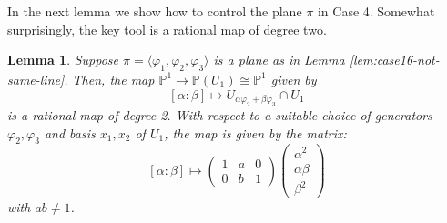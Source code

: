 \documentclass[10pt,reqno]{amsart}
\newcommand{\la}{\langle}
\newcommand{\ra}{\rangle}
\newcommand{\PP}{\mathbb P}
\renewcommand{\a}{\alpha}
\renewcommand{\b}{\beta}
\newcommand{\f}{\varphi}
\newtheorem{lemma}[theorem]{Lemma}
\theoremstyle{definition}
\begin{document}
\noindent In the next lemma we show how to control the plane $\pi$ in Case 4. Somewhat surprisingly, the key tool is a rational map of degree two.

\begin{lemma} \label{lem:rational-map}
Suppose $\pi =\la \f_1, \f_2, \f_3 \ra$ is a plane as in Lemma \ref{lem:case16-not-same-line}. Then, the map $\PP^1 \to \PP(U_1) \cong \PP^1$ given by
\[
[\a:\b] \mapsto U_{\a\f_2+\b\f_3} \cap U_1
\]
is a rational map of degree 2. With respect to a suitable choice of generators $\f_2, \f_3$ and basis $x_1,x_2$ of $U_1$, the map is given by the matrix:
\[
[\a : \b] \mapsto 
\begin{pmatrix}
    1 & a & 0 \\
    0 & b & 1
\end{pmatrix} 
\begin{pmatrix}
    \a^2 \\
    \a \b \\
    \b^2
\end{pmatrix}
\]
with $ab \ne 1$.
\end{lemma}
\end{document}
